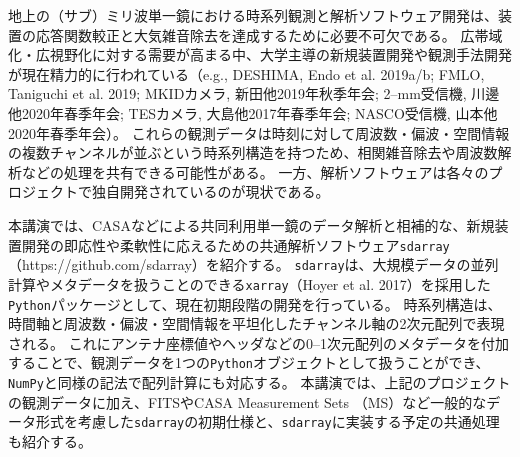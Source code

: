 \documentclass[ja]{2020a}
\begin{document}

地上の（サブ）ミリ波単一鏡における時系列観測と解析ソフトウェア開発は、装置の応答関数較正と大気雑音除去を達成するために必要不可欠である。
広帯域化・広視野化に対する需要が高まる中、大学主導の新規装置開発や観測手法開発が現在精力的に行われている（e.g., DESHIMA, Endo et al. 2019a/b; FMLO, Taniguchi et al. 2019; MKIDカメラ, 新田他2019年秋季年会; 2--mm受信機, 川邊他2020年春季年会; TESカメラ, 大島他2017年春季年会; NASCO受信機, 山本他2020年春季年会）。
これらの観測データは時刻に対して周波数・偏波・空間情報の複数チャンネルが並ぶという時系列構造を持つため、相関雑音除去や周波数解析などの処理を共有できる可能性がある。
一方、解析ソフトウェアは各々のプロジェクトで独自開発されているのが現状である。

本講演では、CASAなどによる共同利用単一鏡のデータ解析と相補的な、新規装置開発の即応性や柔軟性に応えるための共通解析ソフトウェア\texttt{sdarray}（https://github.com/sdarray）を紹介する。
\texttt{sdarray}は、大規模データの並列計算やメタデータを扱うことのできる\texttt{xarray}（Hoyer et al. 2017）を採用した\texttt{Python}パッケージとして、現在初期段階の開発を行っている。
時系列構造は、時間軸と周波数・偏波・空間情報を平坦化したチャンネル軸の2次元配列で表現される。
これにアンテナ座標値やヘッダなどの0--1次元配列のメタデータを付加することで、観測データを1つの\texttt{Python}オブジェクトとして扱うことができ、\texttt{NumPy}と同様の記法で配列計算にも対応する。
本講演では、上記のプロジェクトの観測データに加え、FITSやCASA Measurement Sets （MS）など一般的なデータ形式を考慮した\texttt{sdarray}の初期仕様と、\texttt{sdarray}に実装する予定の共通処理も紹介する。

\end{document}
